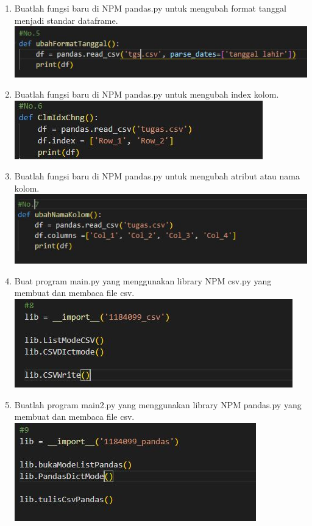 \begin{enumerate}
\item Buatlah fungsi baru di NPM pandas.py untuk mengubah format tanggal menjadi standar dataframe.\\ %
\includegraphics{gambar/csv11.jpg}

\item Buatlah fungsi baru di NPM pandas.py untuk mengubah index kolom.\\ %
\includegraphics{gambar/csv12.jpg}

\item Buatlah fungsi baru di NPM pandas.py untuk mengubah atribut atau nama kolom.\\ %
\includegraphics{gambar/csv13.jpg}

\item Buat program  main.py yang menggunakan library NPM csv.py yang membuat dan membaca file csv.\\ %
\includegraphics{gambar/csv14.jpg}

\item Buatlah program  main2.py yang menggunakan library NPM pandas.py yang membuat dan membaca file csv.\\ %
\includegraphics{gambar/csv15.jpg}

\end{enumerate}

